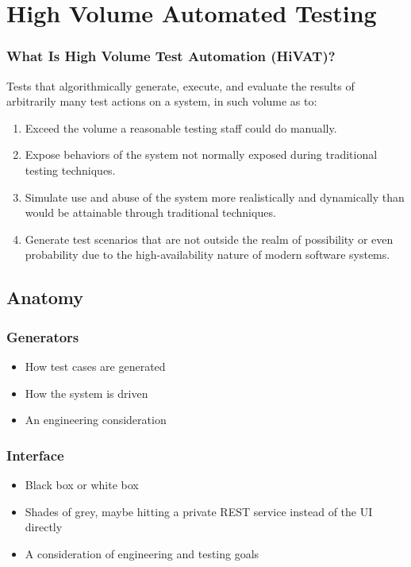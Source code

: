 \section{High Volume Automated Testing}

\begin{frame}
  \frametitle{What Is High Volume Test Automation (HiVAT)?}
  Tests that algorithmically generate, execute, and evaluate the results of arbitrarily many test actions on a system, in such volume as to:\citep{KanerHivatOverview}
  \begin{enumerate}
  \item Exceed the volume a reasonable testing staff could do manually.
  \item Expose behaviors of the system not normally exposed during traditional testing techniques.
  \item Simulate use and abuse of the system more realistically and dynamically than would be attainable through traditional techniques.
  \item Generate test scenarios that are not outside the realm of possibility or even probability due to the high-availability nature of modern software systems.
\end{enumerate}
\end{frame}

\subsection{Anatomy}

\begin{frame}
  \frametitle{Generators}
  \begin{itemize}
    \item How test cases are generated
    \item How the system is driven
    \item An engineering consideration
  \end{itemize}
\end{frame}

\begin{frame}
  \frametitle{Interface}
  \begin{itemize}
    \item Black box or white box
    \item Shades of grey, maybe hitting a private REST service instead of the UI directly
    \item A consideration of engineering and testing goals
  \end{itemize}
\end{frame}

